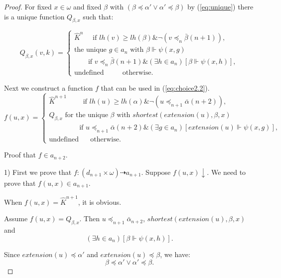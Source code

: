 \documentclass{asl}
\theoremstyle{definition}
\begin{document}
\begin{proof}
For fixed $x\in \omega$ and fixed $\beta$ with $(\beta\preccurlyeq\alpha' \vee \alpha'\preccurlyeq \beta)$ by (\ref{eq:unique}) there is a unique function $Q_{\beta,x}$ such that:

\begin{displaymath}
Q_{\beta,x}(v,k)=
\begin{cases}
\widehat{K}^n \quad \text{ if } lh(v)\geqslant lh(\beta) \& \neg(v\preccurlyeq_n\bar{\beta}(n+1)),\\
\text{the unique }g\in a_n\text{ with }\beta\Vdash \psi(x,g) \\
\qquad \text{if } v\preccurlyeq_n\bar{\beta}(n+1)\& (\exists h\in a_n) \left[\beta\Vdash \psi(x,h)\right] ,\\
\text{undefined } \qquad \text{ otherwise.}
\end{cases}
\end{displaymath} 

Next we construct a function $f$ that can be used in (\ref{eq:choice2.2}). 
\begin{displaymath}
f(u,x)=
\begin{cases}
\widehat{K}^{n+1} \qquad \text{ if } lh(u)\geqslant lh(\alpha) \& \neg(u\preccurlyeq_{n+1}\bar{\alpha}(n+2)),\\
Q_{\beta, x} \text{ for the unique } \beta \text{ with } shortest(extension(u),\beta,x) \\ 
\qquad \qquad \text{ if } u\preccurlyeq_{n+1}\bar{\alpha}(n+2)\&(\exists g\in a_n) \left[extension(u)\Vdash \psi(x,g)\right] ,\\
\text{undefined } \quad \text{ otherwise.}
\end{cases}
\end{displaymath} 

\begin{center}
Proof that $f\in a_{n+2}$.
\end{center}
 
1) First we prove that $f:(d_{n+1}\times\omega)\dashrightarrow a_{n+1}$. 
Suppose $f(u,x)\downarrow$. We need to prove that $f(u,x)\in a_{n+1}$. 

When $f(u,x)=\widehat{K}^{n+1}$, it is obvious. 

Assume $f(u,x)=Q_{\beta,x}$. Then $u\preccurlyeq_{n+1}\bar{\alpha}_{n+2}$,  $shortest(extension(u),\beta,x)$ and
\begin{equation}
(\exists h\in a_n)\left[\beta\Vdash \psi(x,h)\right]. 
\label{eq:choice2.3}
\end{equation}

Since $extension(u)\preccurlyeq \alpha'$ and $extension(u)\preccurlyeq \beta$, we have: 
\[\beta\preccurlyeq \alpha' \vee \alpha'\preccurlyeq \beta.\]


\end{proof}
\end{document}
